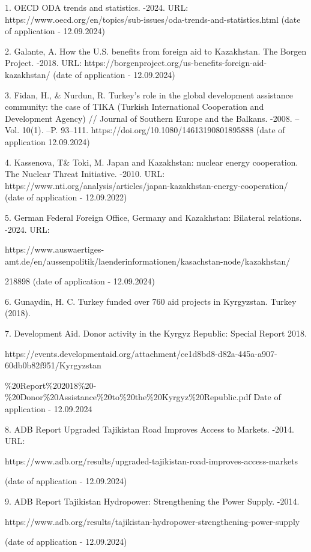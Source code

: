 \begin{noparindent}
1.
OECD ODA trends and statistics. -2024. URL:
https://www.oecd.org/en/topics/sub-issues/oda-trends-and-statistics.html
(date of application - 12.09.2024)

2.
Galante, A. How the U.S. benefits from foreign aid to Kazakhstan. The
Borgen Project. -2018. URL:
https://borgenproject.org/us-benefits-foreign-aid-kazakhstan/ (date of
application - 12.09.2024)

3.
Fidan, H., \& Nurdun, R. Turkey's role in the global development
assistance community: the case of TIKA (Turkish International
Cooperation and Development Agency) // Journal of Southern Europe and
the Balkans. -2008. --Vol. 10(1). --P. 93--111.
https://doi.org/10.1080/14613190801895888 (date of application
12.09.2024)

4.
Kassenova, T\& Toki, M. Japan and Kazakhstan: nuclear energy
cooperation. The Nuclear Threat Initiative. -2010. URL:
https://www.nti.org/analysis/articles/japan-kazakhstan-energy-cooperation/
(date of application - 12.09.2022)

5.
German Federal Foreign Office, Germany and Kazakhstan: Bilateral
relations. -2024. URL:

https://www.auswaertiges-amt.de/en/aussenpolitik/laenderinformationen/kasachstan-node/kazakhstan/

218898
(date of application - 12.09.2024)

6.
Gunaydin, H. C. Turkey funded over 760 aid projects in Kyrgyzstan.
Turkey (2018).

7.
Development Aid. Donor activity in the Kyrgyz Republic: Special Report
2018.

https://events.developmentaid.org/attachment/ce1d8bd8-d82a-445a-a907-60db0b82f951/Kyrgyzstan

\%20Report\%202018\%20-\%20Donor\%20Assistance\%20to\%20the\%20Kyrgyz\%20Republic.pdf
Date of application - 12.09.2024

8.
ADB Report Upgraded Tajikistan Road Improves Access to Markets. -2014.
URL:

https://www.adb.org/results/upgraded-tajikistan-road-improves-access-markets

(date of application - 12.09.2024)

9.
ADB Report Tajikistan Hydropower: Strengthening the Power Supply.
-2014.

https://www.adb.org/results/tajikistan-hydropower-strengthening-power-supply

(date of application - 12.09.2024)


\end{noparindent}
